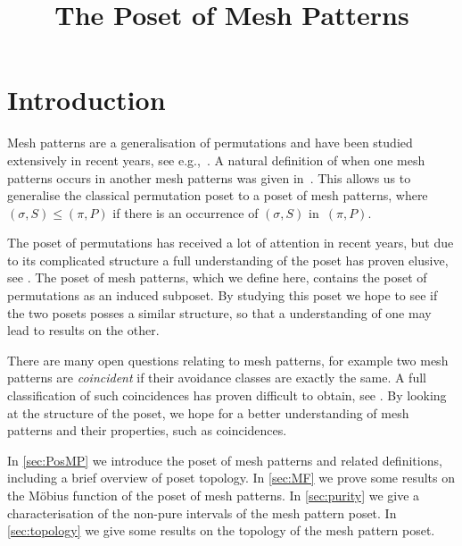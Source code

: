 \documentclass[11pt,a4paper,oneside]{article}
\title{The Poset of Mesh Patterns}
\begin{document}
	\maketitle

\section{Introduction}
Mesh patterns are a generalisation of permutations and have been studied extensively in recent years, see e.g.,~\cite{CTU15,JKR15}.
A natural definition of when one mesh patterns occurs in another mesh patterns was given in~\cite{TU17}.
This allows us to generalise the classical permutation poset to a poset of mesh patterns, where
$(\sigma,S)\le(\pi,P)$ if there is an occurrence of $(\sigma,S)$ in~$(\pi,P)$.

The poset of permutations has received a lot of attention in recent years, but due to its
complicated structure a full understanding of the poset has proven elusive,
see \cite{Smith14,Smith15}. The poset of mesh patterns, which we define
here, contains the poset of permutations as an induced subposet. By studying this poset we
hope to see if the two posets posses a similar structure, so that a understanding of one
may lead to results on the other.

There are many open questions relating to mesh patterns, for example two mesh patterns
are \emph{coincident} if their avoidance classes are exactly the same. A full classification
of such coincidences has proven difficult to obtain, see \cite{CTU15}. By looking at
the structure of the poset,
we hope for a better understanding of mesh patterns and their properties,
such as coincidences.

In \cref{sec:PosMP} we introduce the poset of mesh patterns and related definitions,
including a brief overview of poset topology. In \cref{sec:MF} we prove some results
on the M\"obius function of the poset of mesh patterns. In \cref{sec:purity} we give
a characterisation of the non-pure intervals of the mesh pattern poset.
In \cref{sec:topology} we give some results on the topology of the mesh pattern poset.
\end{document}
